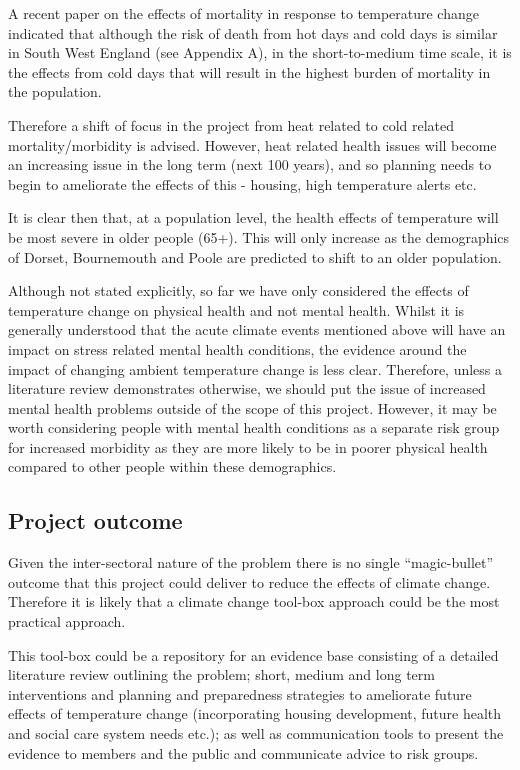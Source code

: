 A recent paper on the effects of mortality in response to temperature change indicated that although the risk of death from hot days and cold days is similar in South West England (see Appendix A), in the short-to-medium time scale, it is the effects from cold days that will result in the highest burden of mortality in the population.\cite{Hajat2014}

Therefore a shift of focus in the project from heat related to cold related mortality/morbidity is advised. However, heat related health issues will become an increasing issue in the long term (next 100 years), and so planning needs to begin to ameliorate the effects of this - housing, high temperature alerts etc.

It is clear then that, at a population level, the health effects of temperature will be most severe in older people (65+). This will only increase as the demographics of Dorset, Bournemouth and Poole are predicted to shift to an older population.

Although not stated explicitly, so far we have only considered the effects of temperature change on physical health and not mental health. Whilst it is generally understood that the acute climate events mentioned above will have an impact on stress related mental health conditions, the evidence around the impact of changing ambient temperature change is less clear. Therefore, unless a literature review demonstrates otherwise, we should put the issue of increased mental health problems outside of the scope of this project. However, it may be worth considering people with mental health conditions as a separate risk group for increased morbidity as they are more likely to be in poorer physical health compared to other people within these demographics.

\subsection{Project outcome}

Given the inter-sectoral nature of the problem there is no single ``magic-bullet'' outcome that this project could deliver to reduce the effects of climate change. Therefore it is likely that a climate change tool-box approach could be the most practical approach. 

This tool-box could be a repository for an evidence base consisting of a detailed literature review outlining the problem; short, medium and long term interventions and planning and preparedness strategies to ameliorate future effects of temperature change (incorporating housing development, future health and social care system needs etc.); as well as communication tools to present the evidence to members and the public and communicate advice to risk groups.  

